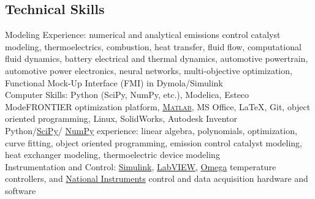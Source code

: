 \documentclass[centered]{res}
\begin{document}
\begin{resume}
\section{Technical Skills}
% 
Modeling Experience: numerical and analytical emissions control
catalyst modeling, thermoelectrics, combustion, heat transfer, fluid
flow, computational fluid dynamics, battery electrical and thermal
dynamics, automotive powertrain, automotive power electronics, neural
networks, multi-objective optimization, Functional Mock-Up Interface
(FMI) in Dymola/Simulink
\vspace{5pt} \\
Computer Skills: Python (SciPy, NumPy, etc.), Modelica, Esteco
ModeFRONTIER optimization platform,
\href{http://www.mathworks.com/products/matlab/}{\textsc{Matlab}}, MS
Office, \LaTeX, Git, object oriented programming, Linux, SolidWorks,
Autodesk Inventor
\vspace{5pt} \\
%
Python/\href{http://www.scipy.org/}{SciPy}/%
\href{http://numpy.scipy.org/}{NumPy}
experience: linear algebra, polynomials, optimization, curve fitting,
object oriented programming, emission control catalyst modeling, heat
exchanger modeling, thermoelectric device modeling
\vspace{5pt} \\
%
Instrumentation and Control:
\href{http://www.mathworks.com/products/simulink/}{Simulink},
\href{http://www.ni.com/}{LabVIEW},
\href{http://www.omega.com/}{Omega} temperature controllers, and
\href{http://www.ni.com}{National Instruments} control and data
acquisition hardware and software
%

\end{resume}
\end{document}
